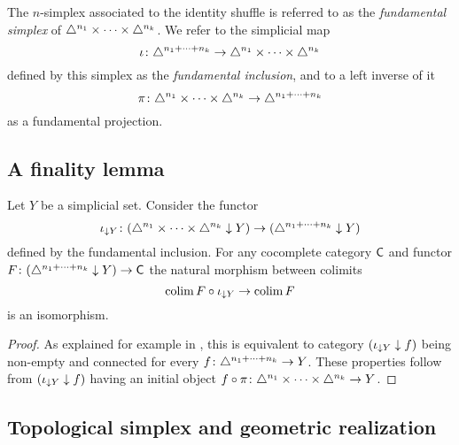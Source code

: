 The $n$-simplex associated to the identity shuffle is referred to as the \textit{fundamental simplex} of $\triangle^{n_1} \times \dots \times \triangle^{n_k}$.
We refer to the simplicial map
\[
\operatorname{\iota} \colon
\triangle^{n_1+\dots+n_k} \to
\triangle^{n_1} \times \dots \times \triangle^{n_k}
\]
defined by this simplex as the \textit{fundamental inclusion}, and to a left inverse of it
\[
\operatorname{\pi} \colon
\triangle^{n_1} \times \dots \times \triangle^{n_k} \to
\triangle^{n_1+\dots+n_k}
\]
as a fundamental projection. 


\subsection{A finality lemma} \label{ss:finality}

Let $Y$ be a simplicial set.
Consider the functor
\[
\operatorname{\iota}_{\downarrow Y} \colon (\triangle^{n_1} \times \dots \times \triangle^{n_k} \downarrow Y) \to (\triangle^{n_1+\dots+n_k} \downarrow Y)
\]
defined by the fundamental inclusion.
For any cocomplete category $\mathsf{C}$ and functor $F \colon (\triangle^{n_1+\dots+n_k} \downarrow Y) \to \mathsf{C}$ the natural morphism between colimits
\[
\operatorname*{colim} F \circ \operatorname{\iota}_{\downarrow Y} \to \operatorname*{colim} F
\]
is an isomorphism.

\begin{proof}
	As explained for example in \cite[]{riehl2014categorical}, this is equivalent to category $(\operatorname{\iota}_{\downarrow Y} \downarrow f)$ being non-empty and connected for every $f \colon \triangle^{n_1+\dots+n_k} \to Y$.
	These properties follow from $(\operatorname{\iota}_{\downarrow Y} \downarrow f)$ having an initial object $f \circ \operatorname{\pi} \colon \triangle^{n_1} \times \dots \times \triangle^{n_k} \to Y$.
\end{proof}

\subsection{Topological simplex and geometric realization}

